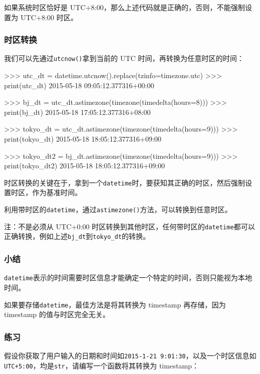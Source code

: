 如果系统时区恰好是
UTC+8:00，那么上述代码就是正确的，否则，不能强制设置为 UTC+8:00 时区。

\hypertarget{ux65f6ux533aux8f6cux6362}{%
\subsubsection{时区转换}\label{ux65f6ux533aux8f6cux6362}}

我们可以先通过\texttt{utcnow()}拿到当前的 UTC
时间，再转换为任意时区的时间：

\begin{pythoncode}
>>> utc_dt = datetime.utcnow().replace(tzinfo=timezone.utc)
>>> print(utc_dt)
2015-05-18 09:05:12.377316+00:00

>>> bj_dt = utc_dt.astimezone(timezone(timedelta(hours=8)))
>>> print(bj_dt)
2015-05-18 17:05:12.377316+08:00

>>> tokyo_dt = utc_dt.astimezone(timezone(timedelta(hours=9)))
>>> print(tokyo_dt)
2015-05-18 18:05:12.377316+09:00

>>> tokyo_dt2 = bj_dt.astimezone(timezone(timedelta(hours=9)))
>>> print(tokyo_dt2)
2015-05-18 18:05:12.377316+09:00
\end{pythoncode}

时区转换的关键在于，拿到一个\texttt{datetime}时，要获知其正确的时区，然后强制设置时区，作为基准时间。

利用带时区的\texttt{datetime}，通过\texttt{astimezone()}方法，可以转换到任意时区。

注：不是必须从 UTC+0:00
时区转换到其他时区，任何带时区的\texttt{datetime}都可以正确转换，例如上述\texttt{bj\_dt}到\texttt{tokyo\_dt}的转换。

\hypertarget{ux5c0fux7ed3}{%
\subsubsection{小结}\label{ux5c0fux7ed3}}

\texttt{datetime}表示的时间需要时区信息才能确定一个特定的时间，否则只能视为本地时间。

如果要存储\texttt{datetime}，最佳方法是将其转换为 timestamp 再存储，因为
timestamp 的值与时区完全无关。

\hypertarget{ux7ec3ux4e60}{%
\subsubsection{练习}\label{ux7ec3ux4e60}}

假设你获取了用户输入的日期和时间如\texttt{2015-1-21\ 9:01:30}，以及一个时区信息如\texttt{UTC+5:00}，均是\texttt{str}，请编写一个函数将其转换为
timestamp：

